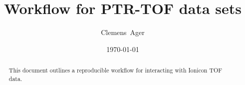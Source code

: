 \documentclass[twocolumn]{article}
\title{Workflow for PTR-TOF data sets}
\author{Clemens~Ager}
\date{\today}
\begin{document}
\maketitle

\begin{abstract}
  This document outlines a reproducible workflow for interacting with
  Ionicon TOF data.  
\end{abstract}


\setcounter{tocdepth}{2}
\tableofcontents








\end{document}
